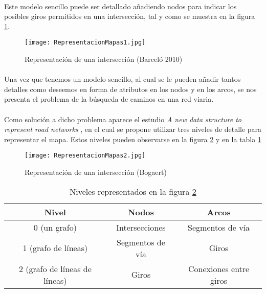 	\paragraph{}
	Este modelo sencillo puede ser detallado añadiendo nodos para indicar los posibles giros permitidos en una intersección, tal y como se muestra en la figura \ref{fig:RepresentacionMapas1}.
	
	\begin{figure}[ht]
		\centering
			\texttt{[image: RepresentacionMapas1.jpg]}
		\caption{Representación de una intersección (Barceló 2010) \cite{Barcelo2010}}
		\label{fig:RepresentacionMapas1}
	\end{figure}	

	\paragraph{}
	Una vez que tenemos un modelo sencillo, al cual se le pueden añadir tantos detalles como deseemos en forma de atributos en los nodos y en los arcos, se nos presenta el problema de la búsqueda de caminos en una red viaria.
	
	\paragraph{}
	Como solución a dicho problema aparece el estudio \emph{A new data structure to represent road networks} \cite{Bogaert}, en el cual se propone utilizar tres niveles de detalle para representar el mapa. Estos niveles pueden observarse en la figura \ref{fig:RepresentacionMapas2} y en la tabla \ref{table:TablaNiveles}
	
	\begin{figure}[ht]
		\centering
			\texttt{[image: RepresentacionMapas2.jpg]}
		\caption{Representación de una intersección (Bogaert) \cite{Bogaert}}
		\label{fig:RepresentacionMapas2}
	\end{figure}
	
	\begin{table}[ht]
		\begin{tabular}{|c|c|c|}
			\hline
			Nivel & Nodos & Arcos \\
			\hline
			\hline
			0 (un grafo) & Intersecciones & Segmentos de vía \\
			\hline
			1 (grafo de líneas) & Segmentos de vía & Giros \\
			\hline
			2 (grafo de líneas de líneas) & Giros & Conexiones entre giros \\
			\hline
		\end{tabular}

	\caption{Niveles representados en la figura \ref{fig:RepresentacionMapas2}}
	\label{table:TablaNiveles}
	\end{table}
	
